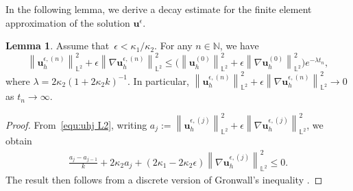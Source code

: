 \documentclass[11pt,reqno]{amsart}
\theoremstyle{definition}
\newtheorem{lemma}[theorem]{Lemma}
\numberwithin{equation}{section}
\newcommand{\bff}{\boldsymbol}
\newcommand{\bb}{\mathbb}
\newcommand{\norm}[2]{\left\|{#1}\right\|_{#2}}
\begin{document}
In the following lemma, we derive a decay estimate for the finite element
approximation of the solution $\bff{u}^\epsilon$.

\begin{lemma}
	Assume that~$\epsilon<\kappa_1/\kappa_2$. For any $n\in \bb{N}$, we have
	\begin{equation*}%
		\norm{\bff{u}_h^{\epsilon, (n)}}{\bb{L}^2}^2
		+
		\epsilon \norm{\nabla \bff{u}_h^{\epsilon, (n)}}{\bb{L}^2}^2
		\leq
		\Big(
			\norm{\bff{u}_h^{(0)}}{\bb{L}^2}^2+ \epsilon \norm{\nabla
			\bff{u}_h^{(0)}}{\bb{L}^2}^2 
		\Big) 
		e^{-\lambda t_n},
	\end{equation*}
	where $\lambda=2\kappa_2(1+2\kappa_2 k)^{-1}$. In particular, $\norm{\bff{u}_h^{\epsilon, (n)}}{\bb{L}^2}^2+ \epsilon \norm{\nabla \bff{u}_h^{\epsilon, (n)}}{\bb{L}^2}^2 \to 0$ as $t_n\to\infty$.
\end{lemma}

\begin{proof}
	From~\eqref{equ:uhj L2}, writing $a_j:= \norm{\bff{u}_h^{\epsilon, (j)}}{\bb{L}^2}^2+ \epsilon \norm{\nabla \bff{u}_h^{\epsilon, (j)}}{\bb{L}^2}^2$, we obtain
	\begin{align*}
		\frac{a_j - a_{j-1}}{k} + 2\kappa_2 a_j + (2\kappa_1-2\kappa_2\epsilon) \norm{\nabla \bff{u}_h^{\epsilon, (j)}}{\bb{L}^2}^2
		\leq
		0.
	\end{align*}
	The result then follows from a discrete version of Gronwall's inequality
	\citep[Proposition~3.1]{Emm99}.
\end{proof}
\end{document}
